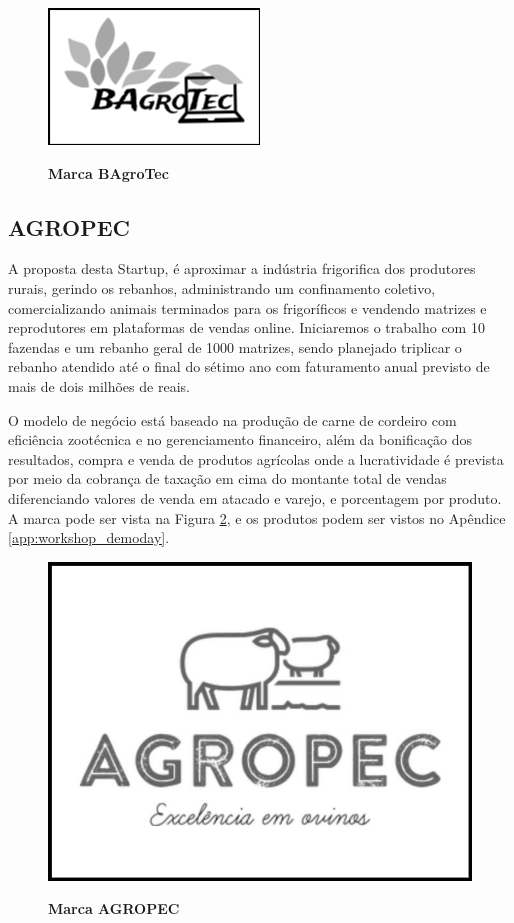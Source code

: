 \begin{figure}[H]
\centering
\caption{\textbf{Marca BAgroTec}}
\includegraphics[scale=0.9]{Imagens/bagrotec.png}
\label{figura_15}
\end{figure}


\subsection{AGROPEC}


A proposta desta Startup, é aproximar a indústria frigorifica dos produtores rurais, gerindo os rebanhos, administrando um confinamento coletivo, comercializando animais terminados para os frigoríficos e vendendo matrizes e reprodutores em plataformas de vendas online. Iniciaremos o trabalho com 10 fazendas e um rebanho geral de 1000 matrizes, sendo planejado triplicar o rebanho atendido até o final do sétimo ano com faturamento anual previsto de mais de dois milhões de reais.

O modelo de negócio está baseado na produção de carne de cordeiro com eficiência zootécnica e no gerenciamento financeiro, além da bonificação dos resultados, compra e venda de produtos agrícolas onde a lucratividade é prevista por meio da cobrança de taxação em cima do montante total de vendas diferenciando valores de venda em atacado e varejo, e porcentagem por produto. A marca pode ser vista na Figura \ref{figura_18}, e os produtos podem ser vistos no Apêndice \ref{app:workshop_demoday}.


\begin{figure}[H]
\centering
\caption{\textbf{Marca AGROPEC}}
\includegraphics[scale=0.2]{Imagens/agropec.jpg}
\label{figura_18}
\end{figure}

